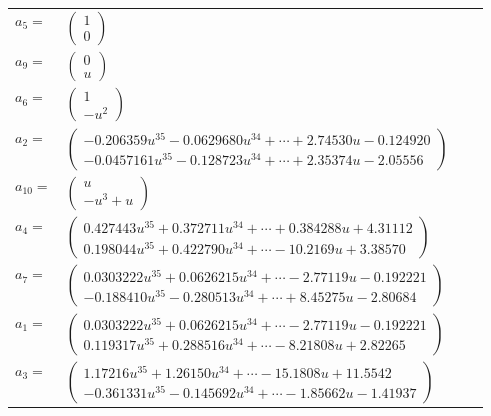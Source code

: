 \documentclass[1p]{elsarticle_modified}
\theoremstyle{definition}
\begin{document}
\begin{tabular}{m{7pt} m{180pt} m{7pt} m{180pt} }
\flushright $a_{5}=$&$\begin{pmatrix}1\\0\end{pmatrix}$ \\
\flushright $a_{9}=$&$\begin{pmatrix}0\\u\end{pmatrix}$ \\
\flushright $a_{6}=$&$\begin{pmatrix}1\\- u^2\end{pmatrix}$ \\
\flushright $a_{2}=$&$\begin{pmatrix}-0.206359 u^{35}-0.0629680 u^{34}+\cdots+2.74530 u-0.124920\\-0.0457161 u^{35}-0.128723 u^{34}+\cdots+2.35374 u-2.05556\end{pmatrix}$ \\
\flushright $a_{10}=$&$\begin{pmatrix}u\\- u^3+u\end{pmatrix}$ \\
\flushright $a_{4}=$&$\begin{pmatrix}0.427443 u^{35}+0.372711 u^{34}+\cdots+0.384288 u+4.31112\\0.198044 u^{35}+0.422790 u^{34}+\cdots-10.2169 u+3.38570\end{pmatrix}$ \\
\flushright $a_{7}=$&$\begin{pmatrix}0.0303222 u^{35}+0.0626215 u^{34}+\cdots-2.77119 u-0.192221\\-0.188410 u^{35}-0.280513 u^{34}+\cdots+8.45275 u-2.80684\end{pmatrix}$ \\
\flushright $a_{1}=$&$\begin{pmatrix}0.0303222 u^{35}+0.0626215 u^{34}+\cdots-2.77119 u-0.192221\\0.119317 u^{35}+0.288516 u^{34}+\cdots-8.21808 u+2.82265\end{pmatrix}$ \\
\flushright $a_{3}=$&$\begin{pmatrix}1.17216 u^{35}+1.26150 u^{34}+\cdots-15.1808 u+11.5542\\-0.361331 u^{35}-0.145692 u^{34}+\cdots-1.85662 u-1.41937\end{pmatrix}$ \\

\end{tabular}
\end{document}
